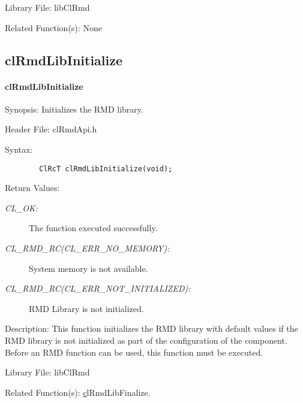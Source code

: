 \begin{flushleft}
\begin{Desc}
\end{Desc}
\begin{Desc}
\item[Library File:]lib\-Cl\-Rmd\end{Desc}
\begin{Desc}
\item[Related Function(s):]None \end{Desc}

\newpage

\subsection{clRmdLibInitialize}
\hypertarget{pagermd104}{}\paragraph{cl\-Rmd\-Lib\-Initialize}\label{pagermd104}
\begin{Desc}
\item[Synopsis:]Initializes the RMD library.\end{Desc}
\begin{Desc}
\item[Header File:]clRmdApi.h\end{Desc}
\begin{Desc}
\item[Syntax:]

\footnotesize\begin{verbatim}        ClRcT clRmdLibInitialize(void);
\end{verbatim}
\normalsize
\end{Desc}
\begin{Desc}
\item[Return Values:]
\begin{description}
\item[{\em CL\_\-OK:}]The function executed successfully. 
\item[{\em CL\_\-RMD\_\-RC(CL\_\-ERR\_\-NO\_\-MEMORY):}]System memory is not available.
\item[{\em CL\_\-RMD\_\-RC(CL\_\-ERR\_\-NOT\_\-INITIALIZED):}]RMD Library is not initialized. 
\end{description}
\end{Desc}
\begin{Desc}
\item[Description:]
This function initializes the RMD library with default values if the RMD library is not initialized as part of the configuration of the component. 
Before an RMD function can be used, this function must be executed.
\end{Desc}
\begin{Desc}
\item[Library File:]lib\-Cl\-Rmd\end{Desc}
\begin{Desc}
\item[Related Function(s):]\hyperlink{pagermd105}clRmdLibFinalize. \end{Desc}


\end{flushleft}
